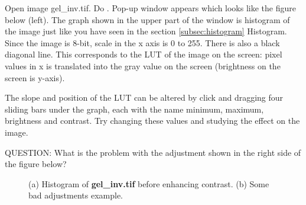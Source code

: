 \begin{indentexercise}{1}
Open image gel\_inv.tif. Do . 
Pop-up window appears which looks like the
figure below (left). The graph shown in the upper part of the window is
histogram of the image just like you have seen in the section \ref{subsec:histogram} Histogram. 
Since the image is 8-bit, scale in the x axis is 0 to 255.
There is also a black diagonal line. This corresponds to the LUT of the
image on the screen: pixel values in x is translated into the gray
value on the screen (brightness on the screen is y-axis). 

The slope and position of the LUT can be altered by click and dragging
four sliding bars under the graph, each with the name minimum, maximum,
brightness and contrast. Try changing these values and studying the
effect on the image. 

QUESTION: What is the problem with the adjustment shown in the
right side of the figure below?

\begin{figure}[htbp]
 \centering
 \caption{ (a) Histogram of \textbf{gel\_inv.tif} before enhancing contrast. (b) Some bad adjustments example. }
 \label{fig:quizEnhanceContrast}
\end{figure} 

\end{indentexercise}

